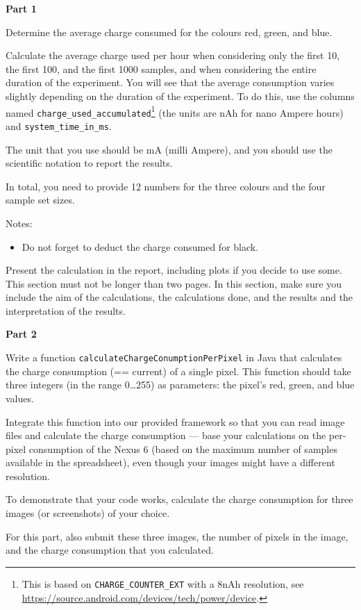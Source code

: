 \documentclass{pracs}
\begin{document}
\noindent\textbf{Part 1}

Determine the average charge consumed for the colours red, green, and blue. 

Calculate the average charge used per hour when considering only the first 10, the first 100, and the first 1000 samples, and when considering the entire duration of the experiment. You will see that the average consumption varies slightly depending on the duration of the experiment. To do this, use the columns named \texttt{charge\_used\_accumulated}\footnote{This is based on \texttt{CHARGE\_COUNTER\_EXT} with a 8nAh resolution, see \url{https://source.android.com/devices/tech/power/device}.} (the units are nAh for nano Ampere hours) and \texttt{system\_time\_in\_ms}. 

The unit that you use should be mA (milli Ampere), and you should use the scientific notation to report the results.

In total, you need to provide 12 numbers for the three colours and the four sample set sizes.

Notes:
\begin{itemize}
\item Do not forget to deduct the charge consumed for black.
\end{itemize}

Present the calculation in the report, including plots if you decide to use some. This section must not be longer than two pages. In this section, make sure you include the aim of the calculations, the calculations done, and the results and the interpretation of the results.

\noindent\textbf{Part 2}

Write a function \texttt{calculateChargeConumptionPerPixel} in Java that calculates the charge consumption (== current) of a single pixel. This function should take three integers (in the range 0\ldots255) as parameters: the pixel's red, green, and blue values.

Integrate this function into our provided framework so that you can read image files and calculate the charge consumption --- base your calculations on the per-pixel consumption of the Nexus 6 (based on the maximum number of samples available in the spreadsheet), even though your images might have a different resolution. 

To demonstrate that your code works, calculate the charge consumption for three images (or screenshots) of your choice. 

For this part, also submit these three images, the number of pixels in the image, and the charge consumption that you calculated.
\end{document}

